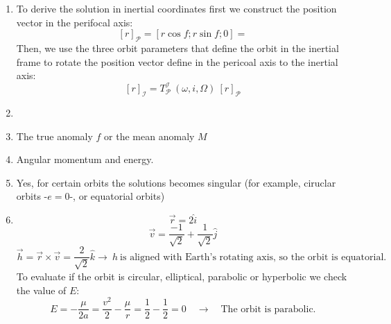 \documentclass[a4paper]{article}
\begin{document}
\begin{enumerate}[label=\emph{\alph*)}]
  \itemi %
    Fundamental orbital differential equations:
    \[\ddot{\vec{r}}+\mu\frac{\vec{r}}{r^3}=0\]
    Polar coordinate solution:
    \[r = \frac{p}{1+e\cdot\cos{f}} \qquad \textrm{with:}\]
    \[p = \frac{h^2}{\mu},~~ e=\sqrt{1+\frac{2e h^2}{\mu^2}} ~~ \textrm{and} ~~ f=\theta-\omega\]
    
  \item %
    To derive the solution in inertial coordinates first we construct the position vector in the perifocal axis:
    \[[r]_{\mathscr{P}}=[r\cos{f};r\sin{f};0] = \]
    Then, we use the three orbit parameters that define the orbit in the inertial frame to rotate the position vector define in the pericoal axis to the inertial axis:
    \[ [r]_{\mathscr{I}} =T_{\mathscr{P}}^{\mathscr{I}}~(\omega,i,\Omega) ~[r]_{\mathscr{P}}\] 
  
  \item %

    
  \item %
    The true anomaly $f$  or the mean anomaly $M$
    
  \item %
    Angular momentum and energy.
    
  \item %
    Yes, for certain orbits the solutions becomes singular (for example, ciruclar orbits -$e=0$-, or equatorial orbits)
   
  \item %
    \[\vec{r} = 2 \hat{i}\]
    \[\vec{v} = \frac{-1}{\sqrt{2}}+\frac{1}{\sqrt{2}}\hat{j}\]
    \[\vec{h} = \vec{r} \times \vec{v}= \frac{2}{\sqrt{2}}\hat{k} \rightarrow ~ h ~ \textrm{is aligned with Earth's rotating axis, so the orbit is equatorial.}\]
    To evaluate if the orbit is circular, elliptical, parabolic or hyperbolic we check the value of $E$:
    \[E = -\frac{\mu}{2a} = \frac{v^2}{2}-\frac{\mu}{r} = \frac{1}{2} - \frac{1}{2} = 0 \quad \rightarrow \quad \textrm{The orbit is parabolic.}\]

\end{enumerate}
\end{document}
